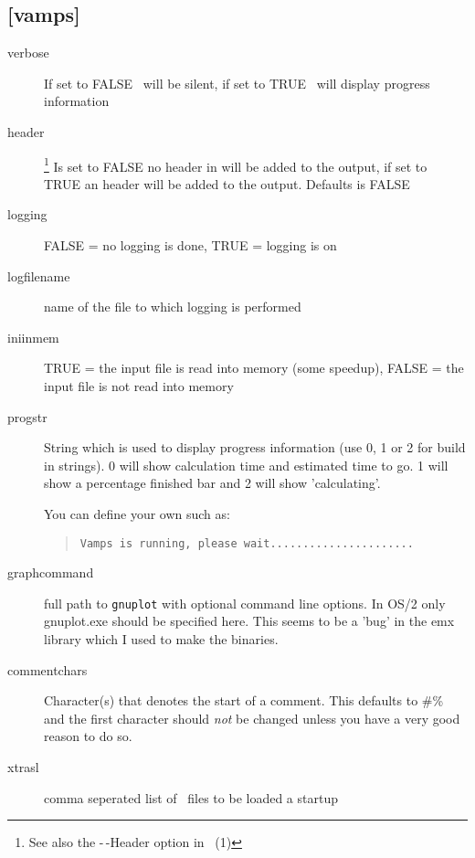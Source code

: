 \subsection{[vamps]}\label{section:defaults}
\begin{description}
\item[verbose] If set to FALSE \vamps\ will be  silent, if set to
TRUE \vamps\ will display progress information

\item[header]\footnote{See also the -\,-Header option in \vamps\ (1)}
Is set to FALSE  no header in will be added to the output, if
set to TRUE an  header will be added to the output. Defaults is FALSE

\item[logging] FALSE = no logging is done, TRUE = logging is on

\item[logfilename] name of the file to which logging is performed

\item[iniinmem]
TRUE = the input file is read into memory (some speedup), FALSE = the
input file is not read into memory

\item[progstr]
String which is used to display progress information (use 0, 1 or 2
for build in strings).  0 will show calculation time and estimated
time to go. 1 will show a percentage finished bar and 2 will show
'calculating'.

You can define your own such as:
\begin{quote}
{\tt Vamps is running, please wait......................}
\end{quote}


\item[graphcommand] full path to {\tt gnuplot}
with optional command line options. In OS/2 only gnuplot.exe should be
specified here. This seems to be a 'bug' in the emx library which I used
to make the binaries.

\item[commentchars]
Character(s) that denotes the start of a comment. This defaults to \#\%
and the first character should {\em not} be changed unless you have a
very good reason to do so.

\item[xtrasl]
comma seperated  list of \slang\ files to be loaded a startup
\end{description}

